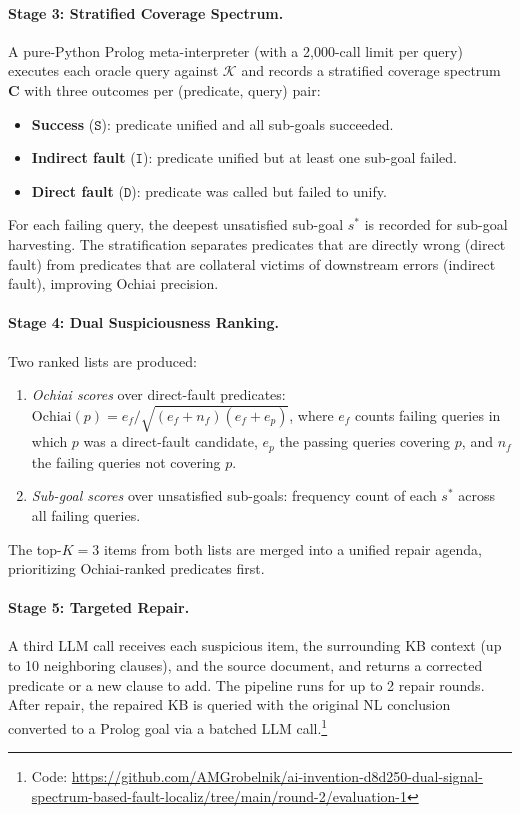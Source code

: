 \documentclass[11pt,letterpaper]{article}
\begin{document}
\paragraph{Stage 3: Stratified Coverage Spectrum.} A pure-Python Prolog meta-interpreter (with a 2,000-call limit per query) executes each oracle query against $\mathcal{K}$ and records a stratified coverage spectrum $\mathbf{C}$ with three outcomes per (predicate, query) pair:
\begin{itemize}
  \item \textbf{Success} ($\mathtt{S}$): predicate unified and all sub-goals succeeded.
  \item \textbf{Indirect fault} ($\mathtt{I}$): predicate unified but at least one sub-goal failed.
  \item \textbf{Direct fault} ($\mathtt{D}$): predicate was called but failed to unify.
\end{itemize}
For each failing query, the deepest unsatisfied sub-goal $s^*$ is recorded for sub-goal harvesting. The stratification separates predicates that are directly wrong (direct fault) from predicates that are collateral victims of downstream errors (indirect fault), improving Ochiai precision.

\paragraph{Stage 4: Dual Suspiciousness Ranking.} Two ranked lists are produced:
\begin{enumerate}
  \item \emph{Ochiai scores} over direct-fault predicates: $\text{Ochiai}(p) = e_f / \sqrt{(e_f + n_f)(e_f + e_p)}$, where $e_f$ counts failing queries in which $p$ was a direct-fault candidate, $e_p$ the passing queries covering $p$, and $n_f$ the failing queries not covering $p$.
  \item \emph{Sub-goal scores} over unsatisfied sub-goals: frequency count of each $s^*$ across all failing queries.
\end{enumerate}
The top-$K=3$ items from both lists are merged into a unified repair agenda, prioritizing Ochiai-ranked predicates first.

\paragraph{Stage 5: Targeted Repair.} A third LLM call receives each suspicious item, the surrounding KB context (up to 10 neighboring clauses), and the source document, and returns a corrected predicate or a new clause to add. The pipeline runs for up to 2 repair rounds. After repair, the repaired KB is queried with the original NL conclusion converted to a Prolog goal via a batched LLM call.\footnote{Code: \url{https://github.com/AMGrobelnik/ai-invention-d8d250-dual-signal-spectrum-based-fault-localiz/tree/main/round-2/evaluation-1}}
\end{document}
